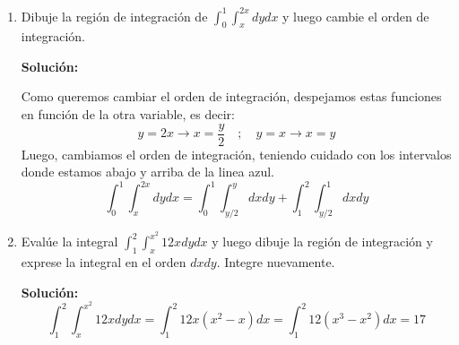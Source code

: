 \documentclass[12pt]{article}
\newenvironment{solucion}
{\begin{mdframed}[backgroundcolor=black!10]
		{\bf Solución:}\\
	}
	{
	\end{mdframed}
}
\newenvironment{preguntas}
{\begin{enumerate}\itemsep12pt
	}
	{
	\end{enumerate}
}
\newcommand{\ra}{\rightarrow}
\begin{document}
\begin{preguntas}
\item Dibuje la región de integración de $\displaystyle\int_0^1 \displaystyle\int_x^{2x} dydx$ y luego cambie el orden de integración.
\begin{solucion}
\begin{center}
		\end{center}
		Como queremos cambiar el orden de integración, despejamos estas funciones en función de la otra variable, es decir:
		$$ y = 2x \ra x = \dfrac{y}{2} \quad; \quad y=x \ra x=y$$
		Luego, cambiamos el orden de integración, teniendo cuidado con los intervalos donde estamos abajo y arriba de la linea azul.
		$$\displaystyle\int_0^1 \displaystyle\int_x^{2x} dydx = 
		\displaystyle\int_0^1 \displaystyle\int_{y/2}^{y} dxdy + 
		\displaystyle\int_1^2 \displaystyle\int_{y/2}^{1} dxdy$$
\end{solucion}
\item Evalúe la integral $\displaystyle\int_1^2 \displaystyle\int_x^{x^2} 12x dydx$ y luego dibuje la región de integración y exprese la integral en el orden $dxdy$. Integre nuevamente.
\begin{solucion}
$$\displaystyle\int_1^2 \displaystyle\int_x^{x^2} 12x dydx =
		\displaystyle\int_1^2 12x(x^2-x)dx = \displaystyle\int_1^2 12(x^3-x^2)dx = 17$$
		\begin{center}
\end{center}
\end{solucion}
\end{preguntas}
\end{document}
